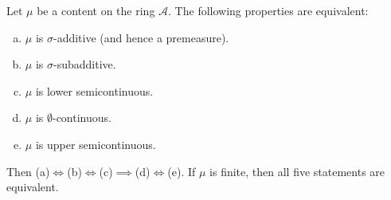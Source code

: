 \begin{theorem}
\label{tripledoubleEquivalence}
    Let $\mu$ be a content on the ring $\mathcal{A}$. The following properties are equivalent:
    \begin{enumerate}[(a)]
        \item $\mu$ is $\sigma$-additive (and hence a premeasure).
        \item $\mu$ is $\sigma$-subadditive.
        \item $\mu$ is lower semicontinuous.
        \item $\mu$ is $\emptyset$-continuous.
        \item $\mu$ is upper semicontinuous.
    \end{enumerate}
    Then (a)$\iff$(b)$\iff$(c)$\implies$(d)$\iff$(e).
    If $\mu$ is finite, then all five statements are equivalent.
\end{theorem}
